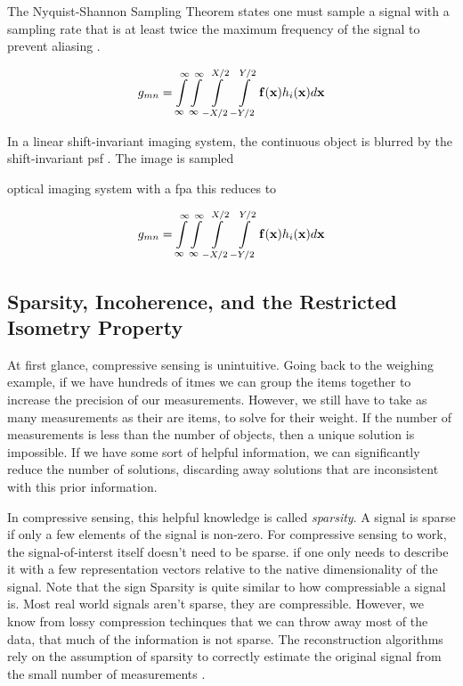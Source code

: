 The Nyquist-Shannon Sampling Theorem states one must sample a signal with a sampling rate that is at least twice the maximum frequency of the signal to prevent aliasing \cite{shannon1949communication}.



\begin{equation}
	g_{mn} = \int\displaylimits_{\infty}^{\infty} \int\displaylimits_{\infty}^{\infty}   \int\displaylimits_{-X/2}^{X/2} \int\displaylimits_{-Y/2}^{Y/2} \mathbf{f}( \mathbf{x} ) h_i ( \mathbf{x} ) d \mathbf{x}
\end{equation}

In a linear shift-invariant imaging system, the continuous object is blurred by the shift-invariant \gls{psf} . The image is sampled  

optical imaging system with a \gls{fpa} this reduces to

\begin{equation}
	g_{mn} = \int\displaylimits_{\infty}^{\infty} \int\displaylimits_{\infty}^{\infty}   \int\displaylimits_{-X/2}^{X/2} \int\displaylimits_{-Y/2}^{Y/2} \mathbf{f}( \mathbf{x} ) h_i ( \mathbf{x} ) d \mathbf{x}
\end{equation}


\subsection{Sparsity, Incoherence, and the Restricted Isometry Property}

At first glance, compressive sensing is unintuitive. Going back to the weighing example, if we have hundreds of itmes we can group the items together to increase the precision of our measurements. However, we still have to take as many measurements as their are items, to solve for their weight. If the number of measurements is less than the number of objects, then a unique solution is impossible. If we have some sort of helpful information, we can significantly reduce the number of solutions, discarding away solutions that are inconsistent with this prior information. 

In compressive sensing, this helpful knowledge is called \emph{sparsity}. A signal is sparse if only a few elements of the signal is non-zero. For compressive sensing to work, the signal-of-interst itself doesn't need to be sparse.  if one only needs to describe it with a few representation vectors relative to the native dimensionality of the signal. Note that the sign  Sparsity is quite similar to how compressiable a signal is. Most real world signals aren't sparse, they are compressible. However, we know from lossy compression techinques that we can throw away most of the data, that much of the information is not sparse. The reconstruction algorithms rely on the assumption of sparsity to correctly estimate the original signal from the small number of measurements \cite{}.

